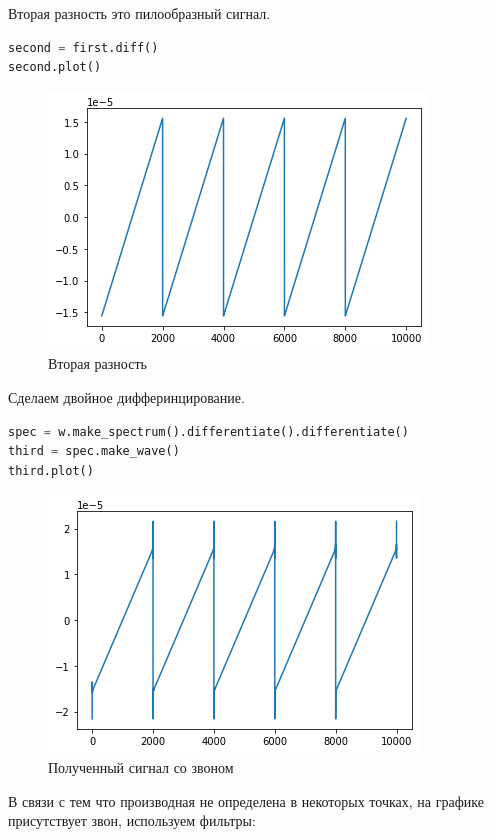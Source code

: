 Вторая разность это пилообразный сигнал.

\begin{lstlisting}[language=Python]
second = first.diff()
second.plot()
\end{lstlisting}
\begin{figure}[H]
	\begin{center}
		\includegraphics[scale=1]{fig/lab09/lab09_13.png}
		\caption{Вторая разность}
	\end{center}
\end{figure}

Сделаем двойное дифферинцирование.

\begin{lstlisting}[language=Python]
spec = w.make_spectrum().differentiate().differentiate()
third = spec.make_wave()
third.plot()
\end{lstlisting}
\begin{figure}[H]
	\begin{center}
		\includegraphics[scale=1]{fig/lab09/lab09_14.png}
		\caption{Полученный сигнал со звоном}
	\end{center}
\end{figure}

В связи с тем что производная не определена в некоторых точках, на графике присутствует звон, используем фильтры:

